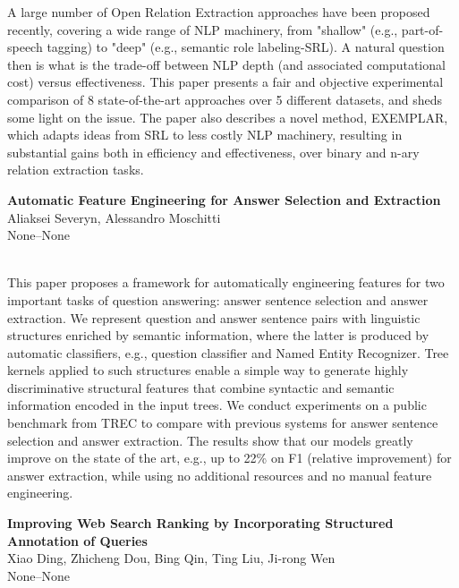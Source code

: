 \documentclass[twoside,makeidx]{book}
\renewcommand{\normalsize}{\fontsize{8}{9}\selectfont}
\renewcommand{\small}{\fontsize{7}{8}\selectfont}
\begin{document}
\nopagebreak%
\noindent%
{\small A large number of Open Relation Extraction approaches have been proposed recently, covering a wide range of NLP machinery, from "shallow" (e.g., part-of-speech tagging) to "deep" (e.g., semantic role labeling-SRL). A natural question then is what is the trade-off between NLP depth (and associated computational cost) versus effectiveness. This paper presents a fair and objective experimental comparison of 8 state-of-the-art approaches over 5 different datasets, and sheds some light on the issue. The paper also describes a novel method, EXEMPLAR, which adapts ideas from SRL to less costly NLP machinery, resulting in substantial gains both in efficiency and effectiveness, over binary and n-ary relation extraction tasks.}
\par\vspace{2em}\noindent%
\begin{minipage}{\linewidth}%
\begin{center}
\textbf{\normalsize Automatic Feature Engineering for Answer Selection and Extraction}\\
\normalsize  Aliaksei Severyn,  Alessandro Moschitti\\
{\small None--None}\\
\end{center}
\end{minipage}\\[0.5em]
\nopagebreak%
\noindent%
{\small This paper proposes a framework for automatically engineering features for two important tasks of  question answering: answer sentence selection and answer extraction. We represent question and answer sentence pairs with linguistic structures enriched by semantic information, where the latter is produced by automatic classifiers, e.g., question classifier and Named Entity Recognizer. Tree kernels applied to such structures enable a simple way to generate highly discriminative structural features that combine syntactic and semantic information encoded in the input trees.   We conduct experiments on a public benchmark from TREC to compare with previous systems for answer sentence selection and answer extraction. The results show that our models greatly improve on the state of the art, e.g., up to 22\% on F1 (relative improvement) for answer extraction, while using no additional resources and no manual feature engineering.}
\par\vspace{2em}\noindent%
\begin{minipage}{\linewidth}%
\begin{center}
\textbf{\normalsize Improving Web Search Ranking by Incorporating Structured Annotation of Queries}\\
\normalsize  Xiao Ding,  Zhicheng Dou,  Bing Qin,  Ting Liu,  Ji-rong Wen\\
{\small None--None}\\
\end{center}
\end{minipage}\\[0.5em]
\end{document}
